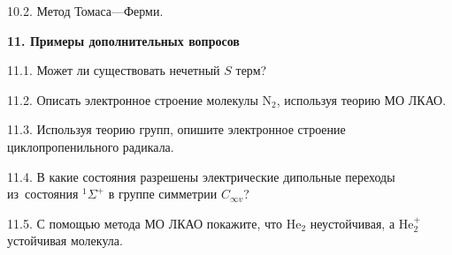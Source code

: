 10.2. Метод Томаса—Ферми.\par
\textbf{11. Примеры дополнительных вопросов}\par
11.1. Может ли существовать нечетный $S$ терм?\par
11.2. Описать электронное строение молекулы N$_2$, используя теорию МО ЛКАО.\par
11.3. Используя теорию групп, опишите электронное строение циклопропенильного радикала.\par
11.4. В какие состояния разрешены электрические дипольные переходы из~состояния $^1\Sigma^+$ в группе симметрии $C_{\infty v}$?\par
11.5. С помощью метода МО ЛКАО покажите, что $\text{He}_2$ неустойчивая, а $\text{He}_2^+$ устойчивая молекула.\par
\newpage

